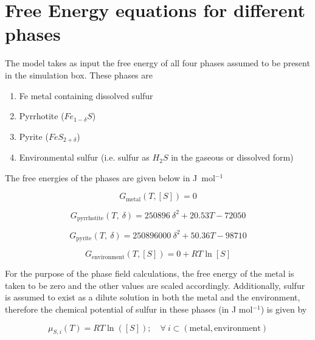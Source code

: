 \documentclass{article}
\begin{document}
\renewcommand{\arraystretch}{1.75}


\section{Free Energy equations for different phases}

The model takes as input the free energy of all four phases assumed to be present in the simulation box. These phases are 

\begin{enumerate}
\item Fe metal containing dissolved sulfur
\item Pyrrhotite ($Fe_{1-\delta}S$)
\item Pyrite ($FeS_{2+\delta}$)
\item Environmental sulfur (i.e. sulfur as $H_2S$ in the gaseous or dissolved form)
\end{enumerate}

The free energies of the phases are given below in J\ mol$^{-1}$

\begin{equation}
  G_{\mathrm{metal}}(T,[S]) = 0
\label{g_met}
\end{equation}

\begin{equation}
  G_{\mathrm{pyrrhotite}}(T,\ \delta) = 250896 \ \delta^2 + 20.53T - 72050
\label{g_pht}
\end{equation}

\begin{equation}
  G_{\mathrm{pyrite}}(T,\ \delta) = 250896000 \ \delta^2 + 50.36T - 98710
\label{g_pyr}
\end{equation}

\begin{equation}
  G_{\mathrm{environment}}(T,[S]) = 0 + RT\ln[S]
\label{g_env}
\end{equation}


For the purpose of the phase field calculations, the free energy of the metal is taken to be zero and the other values are scaled accordingly. Additionally, sulfur is assumed to exist as a dilute solution in both the metal and the environment, therefore the chemical potential of sulfur in these phases (in J mol$^{-1}$) is given by

\begin{equation*}
  \mu_{S,i}(T) = RT\ln([S]); \quad \forall\ i \subset (\mathrm{metal,environment}) 
\end{equation*}
\end{document}
